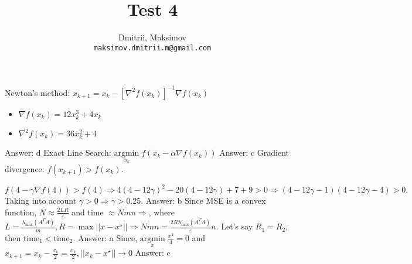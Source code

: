 \documentclass{homework}
\title{Test 4}
\author{
  Dmitrii, Maksimov\\
  \texttt{maksimov.dmitrii.m@gmail.com}
}
\begin{document}
\maketitle

\exercise
Newton's method: $x_{k+1}=x_k - [\nabla^2 f(x_k)]^{-1}\nabla f(x_k)$
\begin{itemize}
	\item $\nabla f(x_k) = 12x_k^3 + 4x_k$
	\item $\nabla^2 f(x_k) = 36x_k^2 + 4$
\end{itemize}
Answer: d
\exercise*
Exact Line Search: $\underset{\alpha_k}{\mathrm{argmin}}\;f(x_k - \alpha\nabla f(x_k))$ \newline Answer: c
\exercise*
Gradient divergence: $f(x_{k+1}) > f(x_k)$.

$f(4 - \gamma\nabla f(4)) > f(4) \Rightarrow 4(4-12\gamma)^2 - 20(4 - 12\gamma) + 7 +9 > 0  \Rightarrow (4 - 12 \gamma - 1)(4 - 12 \gamma - 4) > 0.$ Taking into account $\gamma > 0 \Rightarrow \gamma > 0.25.$ \newline Answer: b
\exercise*
Since MSE is a convex function, $N \approx \frac{2LR}{\varepsilon}$ and time $\approx Nmn \Rightarrow$, where $L = \frac{\lambda_{\max}(A^TA)}{m}, R=\max ||x-x^\star|| \Rightarrow Nmn = \frac{2R\lambda_{\max}(A^TA)}{\varepsilon}n$. Let's say $R_1 = R_2$, then $\text{time}_1 < \text{time}_2.$ \newline Answer: a
\exercise*
Since, $\underset{x}{\mathrm{argmin}}\;\frac{x^2}{4} = 0$ and $x_{k+1}=x_k-\frac{x_k}{2}=\frac{x_k}{2}, ||x_k - x^\star||\rightarrow 0$ \newline Answer: c
\end{document}
